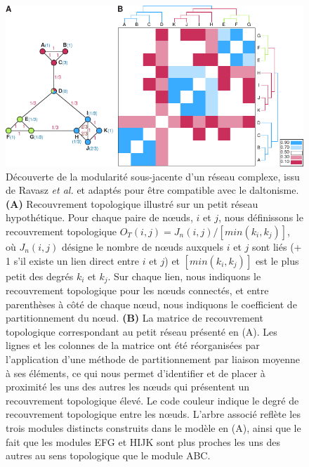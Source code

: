 \begin{figure}[h!]
    \centering
    \includegraphics{img/intro/3_coexpr/intro_3_coexpr_ravasz_topological_overlap.pdf}
    \caption[Découverte de la modularité sous-jacente d'un réseau complexe]{Découverte de la modularité sous-jacente d'un réseau complexe, issu de Ravasz \textit{et al.} \cite{Ravasz2002} et adaptés pour être compatible avec le daltonisme. \textbf{(A)} Recouvrement topologique illustré sur un petit réseau hypothétique. Pour chaque paire de nœuds, $i$ et $j$, nous définissons le recouvrement topologique $O_T(i, j) = J_n(i, j)/[min (k_i,k_j)]$, où $J_n(i, j)$ désigne le nombre de nœuds auxquels $i$ et $j$ sont liés (+ 1 s'il existe un lien direct entre $i$ et $j$) et $[min (k_i,k_j)]$ est le plus petit des degrés $k_i$ et $k_j$. Sur chaque lien, nous indiquons le recouvrement topologique pour les nœuds connectés, et entre parenthèses à côté de chaque nœud, nous indiquons le coefficient de partitionnement du nœud. \textbf{(B)} La matrice de recouvrement topologique correspondant au petit réseau présenté en (A). Les lignes et les colonnes de la matrice ont été réorganisées par l'application d'une méthode de partitionnement par liaison moyenne \cite{Eisen1998Dec} à ses éléments, ce qui nous permet d'identifier et de placer à proximité les uns des autres les nœuds qui présentent un recouvrement topologique élevé. Le code couleur indique le degré de recouvrement topologique entre les nœuds. L'arbre associé reflète les trois modules distincts construits dans le modèle en (A), ainsi que le fait que les modules EFG et HIJK sont plus proches les uns des autres au sens topologique que le module ABC.}
    \label{fig:topological_overlap_schema}
\end{figure}

